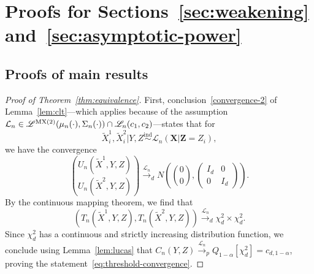\documentclass[12pt]{article}
\theoremstyle{definition}
\theoremstyle{remark}
\newcommand{\prx}{\bm X}
\newcommand{\prz}{\bm Z}
\newcommand{\srz}{Z}
\newcommand{\srxk}{\widetilde X}
\newcommand{\sry}{Y}
\begin{document}
\clearpage


\section{Proofs for Sections~\ref{sec:weakening} and~\ref{sec:asymptotic-power}} \label{sec:proofs-sec45}

\subsection{Proofs of main results}

\begin{proof}[Proof of Theorem~\ref{thm:equivalence}]
	
	First, conclusion~\eqref{convergence-2} of Lemma~\ref{lem:clt}---which applies because of the assumption $\mathcal L_n \in \mathscr L^{\textnormal{MX(2)}}(\mu_n(\cdot), \Sigma_n(\cdot)) \cap \mathscr L_n(c_1, c_2)$---states that for 
	\[
	\srxk^1_i, \srxk^2_i|\sry,\srz \overset{\text{ind}}\sim {\mathcal L_n(\prx|\prz = \srz_i)}, 
	\]
	we have the convergence
	\begin{equation}
		{U_n(\srxk^1, \sry, \srz) \choose U_n(\srxk^2, \sry, \srz)} \overset{\mathcal L_n}\rightarrow_d N\left({0 \choose 0},
		\begin{pmatrix}
			I_d & 0 \\
			0 & I_d
		\end{pmatrix}
		\right).
	\end{equation}
	By the continuous mapping theorem, we find that 
	\begin{equation}
		(T_n(\srxk^1, \sry, \srz), T_n(\srxk^2, \sry, \srz)) \overset{\mathcal L_n}\rightarrow_d  \chi^2_d \times \chi^2_d. 
	\end{equation}
	Since $\chi^2_d$ has a continuous and strictly increasing distribution function, we conclude using Lemma~\ref{lem:lucas} that $C_n(\sry,\srz)  \overset{\mathcal L_n}\rightarrow_p Q_{1-\alpha}[\chi^2_d] =  c_{d,1-\alpha}$, proving the statement~\eqref{eq:threshold-convergence}.
	

\end{proof}
\end{document}
